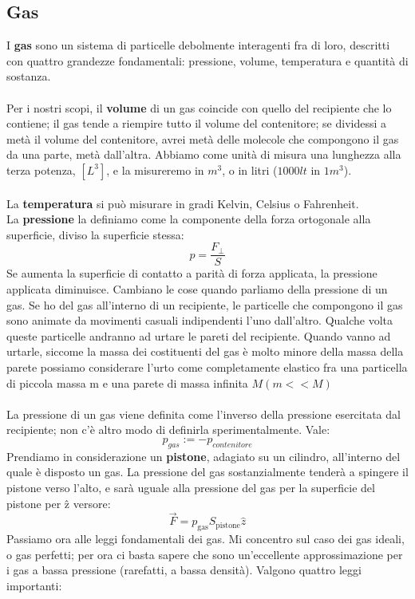 \documentclass{article}
\begin{document}
\subsection{Gas}
I \textbf{gas} sono un sistema di particelle debolmente interagenti fra di loro, descritti con quattro grandezze fondamentali: pressione, volume, temperatura e quantità di sostanza.\\
\\
Per i nostri scopi, il \textbf{volume} di un gas coincide con quello del recipiente che lo contiene; il gas tende a riempire tutto il volume del contenitore; se dividessi a metà il volume del contenitore, avrei metà delle molecole che compongono il gas da una parte, metà dall’altra. Abbiamo come
unità di misura una lunghezza alla terza potenza, \([L^3]\), e la misureremo in \(m^3\), o in litri (\(1000lt\) in \(1 m^3\)).\\
\\
La \textbf{temperatura} si può misurare in gradi Kelvin, Celsius o Fahrenheit.
\\
La \textbf{pressione} la definiamo come la componente della forza ortogonale alla superficie, diviso la superficie stessa:
\[
    p = \frac{F_{\bot}}{S}
\]
Se aumenta la superficie di contatto a parità di forza applicata, la pressione applicata diminuisce. Cambiano le cose quando parliamo della pressione di un gas. Se ho del gas all’interno di un recipiente, le particelle che compongono il gas sono animate da movimenti casuali indipendenti l’uno dall’altro. Qualche volta queste particelle andranno ad urtare le pareti del recipiente. Quando vanno ad urtarle, siccome la massa dei costituenti del gas è molto minore della massa della parete 
possiamo considerare l’urto come completamente elastico fra una particella di piccola massa m e una parete di massa infinita \(M (m << M)\)\\
\\
La pressione di un gas viene definita come l’inverso della pressione esercitata dal recipiente; non c’è altro modo di definirla sperimentalmente. Vale:
\[
    p_{gas} := -p_{contenitore}
\]
Prendiamo in considerazione un \textbf{pistone}, adagiato su un cilindro, all’interno del quale è disposto un gas. La pressione del gas sostanzialmente tenderà a spingere il pistone verso l’alto, e sarà uguale alla pressione del gas per la superficie del pistone per \^{z} versore:
\[
    \Vec{F} = p_{\text{gas}} S_{\text{pistone}} \hat{z}
\]
Passiamo ora alle leggi fondamentali dei gas. Mi concentro sul caso dei gas ideali, o gas perfetti; per ora ci basta sapere che sono un’eccellente approssimazione per i gas a bassa pressione (rarefatti, a bassa densità). Valgono quattro leggi importanti:
\end{document}
